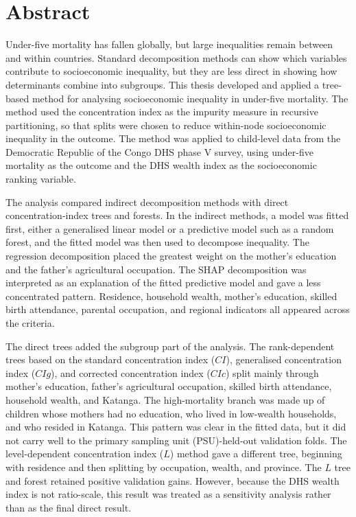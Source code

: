 \documentclass[
  11pt,
  a4paper,
]{article}
\author{}
\date{}
\begin{document}
\section{Abstract}\label{abstract}

Under-five mortality has fallen globally, but large inequalities remain
between and within countries. Standard decomposition methods can show
which variables contribute to socioeconomic inequality, but they are
less direct in showing how determinants combine into subgroups. This
thesis developed and applied a tree-based method for analysing
socioeconomic inequality in under-five mortality. The method used the
concentration index as the impurity measure in recursive partitioning,
so that splits were chosen to reduce within-node socioeconomic
inequality in the outcome. The method was applied to child-level data
from the Democratic Republic of the Congo DHS phase V survey, using
under-five mortality as the outcome and the DHS wealth index as the
socioeconomic ranking variable.

The analysis compared indirect decomposition methods with direct
concentration-index trees and forests. In the indirect methods, a model
was fitted first, either a generalised linear model or a predictive
model such as a random forest, and the fitted model was then used to
decompose inequality. The regression decomposition placed the greatest
weight on the mother's education and the father's agricultural
occupation. The SHAP decomposition was interpreted as an explanation of
the fitted predictive model and gave a less concentrated pattern.
Residence, household wealth, mother's education, skilled birth
attendance, parental occupation, and regional indicators all appeared
across the criteria.

The direct trees added the subgroup part of the analysis. The
rank-dependent trees based on the standard concentration index (\(CI\)),
generalised concentration index (\(CIg\)), and corrected concentration
index (\(CIc\)) split mainly through mother's education, father's
agricultural occupation, skilled birth attendance, household wealth, and
Katanga. The high-mortality branch was made up of children whose mothers
had no education, who lived in low-wealth households, and who resided in
Katanga. This pattern was clear in the fitted data, but it did not carry
well to the primary sampling unit (PSU)-held-out validation folds. The
level-dependent concentration index (\(L\)) method gave a different
tree, beginning with residence and then splitting by occupation, wealth,
and province. The \(L\) tree and forest retained positive validation
gains. However, because the DHS wealth index is not ratio-scale, this
result was treated as a sensitivity analysis rather than as the final
direct result.
\end{document}
